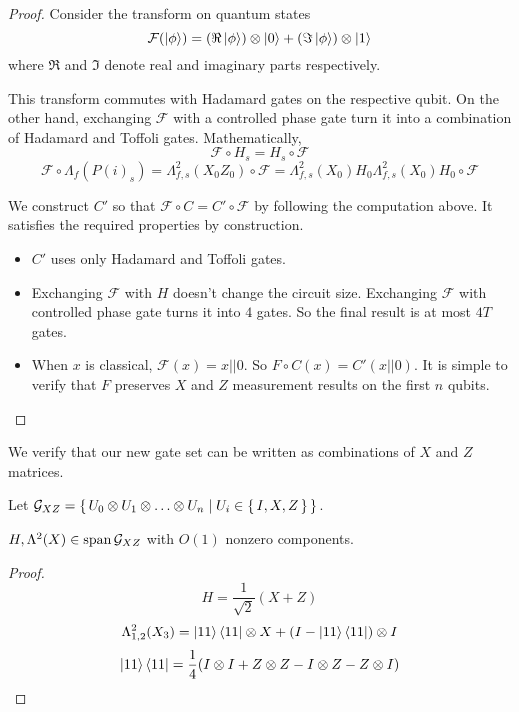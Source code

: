 \begin{proof}

Consider the transform on quantum states
	$$\mathcal{F}(\ket{\phi})=(\Re\ket{\phi})\otimes\ket{0}+(\Im\ket{\phi})\otimes\ket{1}$$
where $\Re$ and $\Im$ denote real and imaginary parts respectively.

This transform commutes with Hadamard gates on the respective qubit. On the other hand, exchanging $\mathcal{F}$ with a controlled phase gate turn it into a combination of Hadamard and Toffoli gates. Mathematically,
$$\mathcal{F}\circ H_s=H_s\circ\mathcal{F}$$
$$\mathcal{F}\circ\Lambda_f(P(i)_s)=\Lambda^2_{f,s}(X_0Z_0)\circ\mathcal{F}=\Lambda^2_{f,s}(X_0)H_0\Lambda^2_{f,s}(X_0)H_0\circ\mathcal{F}$$

We construct $C'$ so that $\mathcal{F}\circ C=C'\circ\mathcal{F}$ by following the computation above. It satisfies the required properties by construction.
\begin{itemize}
	\item $C'$ uses only Hadamard and Toffoli gates.
	\item Exchanging $\mathcal{F}$ with $H$ doesn't change the circuit size. Exchanging $\mathcal{F}$ with controlled phase gate turns it into $4$ gates. So the final result is at most $4T$ gates.
	\item When $x$ is classical, $\mathcal{F}(x)=x||0$. So $F\circ C(x)=C'(x||0)$. It is simple to verify that $F$ preserves $X$ and $Z$ measurement results on the first $n$ qubits.
\end{itemize}
\end{proof}

We verify that our new gate set can be written as combinations of $X$ and $Z$ matrices.

\begin{definition}
	Let $\mathcal{G}_{XZ}=\set{U_0\otimes U_1\otimes\ldots\otimes U_n|U_i\in\set{I,X,Z}}$.
\end{definition}

\begin{theorem}
	$H,\Lambda^2(X)\in\operatorname*{\operatorname{span}}\mathcal{G}_{XZ}$ with $O(1)$ nonzero components.
\end{theorem}

\begin{proof}
	$$H=\frac{1}{\sqrt{2}}(X+Z)$$
	$$\Lambda^2_{1,2}(X_3)=\ket{11}\bra{11}\otimes X+(I-\ket{11}\bra{11})\otimes I$$
	$$\ket{11}\bra{11}=\frac{1}{4}(I\otimes I+Z\otimes Z-I\otimes Z-Z\otimes I)$$
\end{proof}

